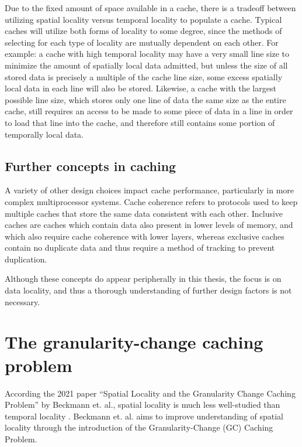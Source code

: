 \documentclass[12pt,twoside]{reedthesis}
\begin{document}
	Due to the fixed amount of space available in a cache, there is a tradeoff between utilizing spatial locality versus temporal locality to populate a cache. Typical caches will utilize both forms of locality to some degree, since the methods of selecting for each type of locality are mutually dependent on each other. For example: a cache with high temporal locality may have a very small line size to minimize the amount of spatially local data admitted, but unless the size of all stored data is precisely a multiple of the cache line size, some excess spatially local data in each line will also be stored. Likewise, a cache with the largest possible line size, which stores only one line of data the same size as the entire cache, still requires an access to be made to some piece of data in a line in order to load that line into the cache, and therefore still contains some portion of temporally local data.

	\subsection*{Further concepts in caching}

	A variety of other design choices impact cache performance, particularly in more complex multiprocessor systems. Cache coherence refers to protocols used to keep multiple caches that store the same data consistent with each other. Inclusive caches are caches which contain data also present in lower levels of memory, and which also require cache coherence with lower layers, whereas exclusive caches contain no duplicate data and thus require a method of tracking to prevent duplication.
	
	Although these concepts do appear peripherally in this thesis, the focus is on data locality, and thus a thorough understanding of further design factors is not necessary.


\section{The granularity-change caching problem}

According the 2021 paper ``Spatial Locality and the Granularity Change Caching Problem'' by Beckmann et. al., spatial locality is much less well-studied than temporal locality  \cite{beckmann}. Beckmann et. al. aims to improve understanding of spatial locality through the introduction of the Granularity-Change (GC) Caching Problem.
\end{document}
